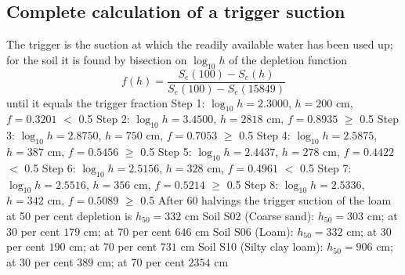 \subsection{Complete calculation of a trigger suction}
\sol
\ans The trigger is the suction at which the readily available water has been used up; for the soil it is found by bisection on $\log_{10}h$ of the depletion function \[f(h)=\dfrac{S_e(100)-S_e(h)}{S_e(100)-S_e(15849)}\] until it equals the trigger fraction
\ans Step 1: $\log_{10}h=2.3000$, $h=200$ cm, $f=0.3201$ $<$ 0.5
\ans Step 2: $\log_{10}h=3.4500$, $h=2818$ cm, $f=0.8935$ $\ge$ 0.5
\ans Step 3: $\log_{10}h=2.8750$, $h=750$ cm, $f=0.7053$ $\ge$ 0.5
\ans Step 4: $\log_{10}h=2.5875$, $h=387$ cm, $f=0.5456$ $\ge$ 0.5
\ans Step 5: $\log_{10}h=2.4437$, $h=278$ cm, $f=0.4422$ $<$ 0.5
\ans Step 6: $\log_{10}h=2.5156$, $h=328$ cm, $f=0.4961$ $<$ 0.5
\ans Step 7: $\log_{10}h=2.5516$, $h=356$ cm, $f=0.5214$ $\ge$ 0.5
\ans Step 8: $\log_{10}h=2.5336$, $h=342$ cm, $f=0.5089$ $\ge$ 0.5
\ans After 60 halvings the trigger suction of the loam at 50 per cent depletion is $h_{50}=332$ cm
\ans Soil S02 (Coarse sand): $h_{50}=303$ cm; at 30 per cent $179$ cm; at 70 per cent $646$ cm
\ans Soil S06 (Loam): $h_{50}=332$ cm; at 30 per cent $190$ cm; at 70 per cent $731$ cm
\ans Soil S10 (Silty clay loam): $h_{50}=906$ cm; at 30 per cent $389$ cm; at 70 per cent $2354$ cm \finans


